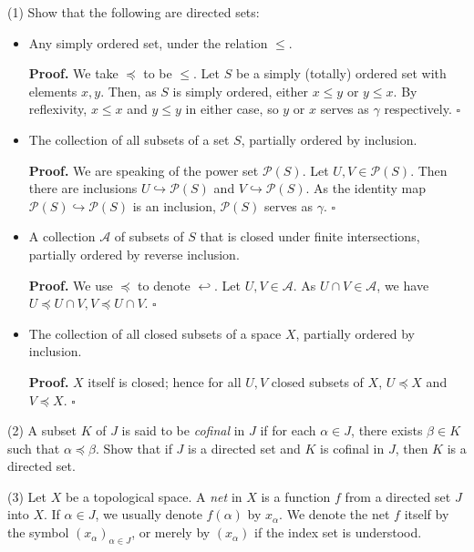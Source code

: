 \documentclass[a4paper]{article}
\begin{document}
(1) Show that the following are directed sets:
\begin{itemize}
    \item Any simply ordered set, under the relation $\leq$.
    
    \textbf{Proof.} We take $\preceq$ to be $\leq$. Let $S$ be a simply (totally) ordered set with elements $x, y$. Then, as $S$ is simply ordered, either $x \leq y$ or $y \leq x$. By reflexivity, $x \leq x$ and $y \leq y$ in either case, so $y$ or $x$ serves as $\gamma$ respectively. $\square$

    \item The collection of all subsets of a set $S$, partially ordered by inclusion.
    
    \textbf{Proof.} We are speaking of the power set $\mathcal{P}(S)$. Let $U, V \in \mathcal{P}(S)$. Then there are inclusions $U \hookrightarrow \mathcal{P}(S)$ and $V \hookrightarrow \mathcal{P}(S)$. As the identity map $\mathcal{P}(S) \hookrightarrow \mathcal{P}(S)$ is an inclusion, $\mathcal{P}(S)$ serves as $\gamma$. $\square$

    \item A collection $\mathscr{A}$ of subsets of $S$ that is closed under finite intersections, partially ordered by reverse inclusion.
    
    \textbf{Proof.} We use $\preceq$ to denote $\hookleftarrow$. Let $U, V \in \mathscr{A}$. As $U \cap V \in \mathscr{A}$, we have $U \preceq U \cap V, V \preceq U \cap V$. $\square$

    \item The collection of all closed subsets of a space $X$, partially ordered by inclusion.
    
    \textbf{Proof.} $X$ itself is closed; hence for all $U, V$ closed subsets of $X$, $U \preceq X$ and $V \preceq X$. $\square$
\end{itemize}

(2) A subset $K$ of $J$ is said to be \emph{cofinal} in $J$ if for each $\alpha \in J$, there exists $\beta \in K$ such that $\alpha \preceq \beta$. Show that if $J$ is a directed set and $K$ is cofinal in $J$, then $K$ is a directed set.

(3) Let $X$ be a topological space. A \emph{net} in $X$ is a function $f$ from a directed set $J$ into $X$. If $\alpha \in J$, we usually denote $f(\alpha)$ by $x_\alpha$. We denote the net $f$ itself by the symbol $(x_\alpha)_{\alpha \in J}$, or merely by $(x_\alpha)$ if the index set is understood.
\end{document}
